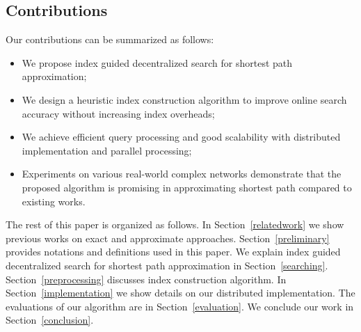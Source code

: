 \subsection{Contributions}
Our contributions can be summarized as follows:

\begin{itemize}
	\item We propose index guided decentralized search for shortest path approximation;
	\item We design a heuristic index construction algorithm to improve online search accuracy without increasing index overheads;
	\item We achieve efficient query processing and good scalability with distributed implementation and parallel processing;
	\item Experiments on various real-world complex networks demonstrate that the proposed algorithm is promising in approximating shortest path compared to existing works.
\end{itemize}

The rest of this paper is organized as follows. In Section~\ref{relatedwork} we show previous works on exact and approximate approaches. Section~\ref{preliminary} provides notations and definitions used in this paper. We explain index guided decentralized search for shortest path approximation in Section~\ref{searching}. Section~\ref{preprocessing} discusses index construction algorithm. In Section~\ref{implementation} we show details on our distributed implementation. The evaluations of our algorithm are in Section~\ref{evaluation}. We conclude our work in Section~\ref{conclusion}.
